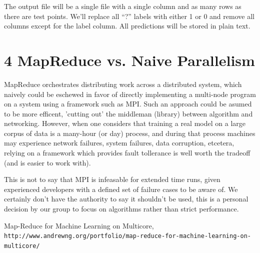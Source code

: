 \documentclass{neu_handout}
\begin{document}
The output file will be a single file with a single column and as many rows as there are test points. We'll replace all “?” labels with either 1 or 0 and remove all columns except for the label column. All predictions will be stored in plain text.

\section*{4 MapReduce vs. Naive Parallelism}
MapReduce orchestrates distributing work across a distributed system, which naively could be eschewed in favor of directly implementing a multi-node program on a system using a framework such as MPI. Such an approach could be asumed to be more efficent, 'cutting out' the middleman (library) between algorithm and networking. However, when one considers that training a real model on a large corpus of data is a many-hour (or day) process, and during that process machines may experience network failures, system failures, data corruption, etcetera, relying on a framework which provides fault tollerance is well worth the tradeoff (and is easier to work with).

This is not to say that MPI is infeasable for extended time runs, given experienced developers with a defined set of failure cases to be aware of. We certainly don't have the authority to say it shouldn't be used, this is a personal decision by our group to focus on algorithms rather than strict performance.

\begin{thebibliography}{9}
Map-Reduce for Machine Learning on Multicore,
\\\texttt{http://www.andrewng.org/portfolio/map-reduce-for-machine-learning-on-multicore/}
\end{thebibliography}
\end{document}
